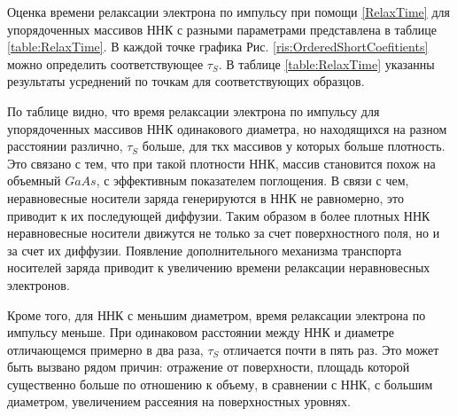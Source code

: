 \documentclass[a4paper,14pt,russian]{extreport}
\begin{document}
				Оценка времени релаксации электрона по импульсу при помощи \ref{RelaxTime} для упорядоченных массивов ННК с разными параметрами представлена в таблице \ref{table:RelaxTime}. В каждой точке графика Рис. \ref{ris:OrderedShortCoefitients} можно определить соответствующее $\tau_S$. В таблице \ref{table:RelaxTime} указанны результаты усреднений по точкам для соответствующих образцов.\par
				По таблице видно, что время релаксации электрона по импульсу для упорядоченных массивов ННК одинакового диаметра, но находящихся на разном расстоянии различно, $\tau_S$ больше, для ткх массивов у которых больше плотность. Это связано с тем, что при такой плотности ННК, массив становится похож на объемный $GaAs$, с эффективным показателем поглощения. В связи с чем, неравновесные носители заряда генерируются в ННК не равномерно, это приводит к их последующей диффузии. Таким образом в более плотных ННК неравновесные носители движутся не только за счет поверхностного поля, но и за счет их диффузии. Появление дополнительного механизма транспорта носителей заряда приводит к увеличению времени релаксации неравновесных электронов.\par
				Кроме того, для ННК с меньшим диаметром, время релаксации электрона по импульсу меньше. При одинаковом расстоянии между ННК и диаметре отличающемся примерно в два раза, $\tau_S$ отличается почти в пять раз. Это может быть вызвано рядом причин: отражение от поверхности, площадь которой существенно больше по отношению к объему, в сравнении с ННК, с большим диаметром, увеличением рассеяния на поверхностных уровнях.\par
\end{document}
